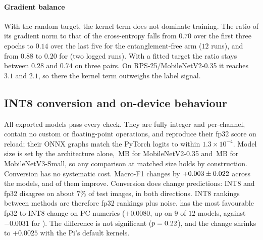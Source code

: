 \paragraph{Gradient balance}
With the random target, the kernel term does not dominate training. The ratio of its gradient norm to that of the cross-entropy falls from $0.70$ over the first three epochs to $0.14$ over the last five for the entanglement-free arm ($12$ runs), and from $0.88$ to $0.20$ for \Pqk (two logged runs).
With a fitted target the ratio stays between $0.28$ and $0.74$ on three pairs. On RPS-25/MobileNetV2-0.35 it reaches $3.1$ and $2.1$, so there the kernel term outweighs the label signal.

\subsection{INT8 conversion and on-device behaviour}
\label{sec:results-device}

\begin{table}[t]
  \centering
  \caption{INT8 models on the Raspberry Pi 4B with the default XNNPACK delegate, four threads, batch size 1: median (p50) and 95th-percentile (p95) invocation time over $500$ calls, mean throughput and the speed-up from one to four threads. Latency and throughput are averages over the methods and seeds of each pair (15--18 models); the thread speed-up is measured on one model per pair. Sizes are in KiB.}
  \label{tab:edge}
\end{table}

All \NIntModels{} exported models pass every check. They are fully integer and per-channel, contain no custom or floating-point operations, and reproduce their fp32 score on reload; their ONNX graphs match the PyTorch logits to within $1.3\times10^{-4}$.
Model size is set by the architecture alone, \MbMnvTwo{}\,MB for MobileNetV2-0.35 and \MbMnvThree{}\,MB for MobileNetV3-Small, so any comparison at matched size holds by construction.
Conversion has no systematic cost. Macro-F1 changes by $+0.003\pm0.022$ across the models, and \IntGained{} of them improve.
Conversion does change predictions: INT8 and fp32 disagree on about $7\%$ of test images, in both directions. INT8 rankings between methods are therefore fp32 rankings plus noise.
\Pqk has the most favourable fp32-to-INT8 change on PC numerics ($+0.0080$, up on $9$ of $12$ models, against $-0.0031$ for \Kd). The difference is not significant ($p=0.22{}$), and the change shrinks to $+0.0025$ with the Pi's default kernels.

